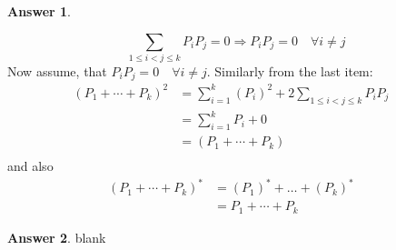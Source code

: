 \documentclass[12pt]{article}
\theoremstyle{plain}
\theoremstyle{definition}
\newtheorem{ans}{Answer}
\begin{document}
\begin{ans}
\begin{enumerate}[(a)]
			\[ \sum_{1 \leq i < j \leq k}P_iP_j = 0 \Rightarrow P_iP_j = 0 \quad \forall i \neq j \]
			Now assume, that $ P_iP_j = 0 \quad \forall i \neq j$. Similarly from the last item:
			\begin{align*}
				(P_1 + \cdots + P_k)^2 &= \sum_{i=1}^{k} (P_i)^2 + 2\sum_{1 \leq i < j \leq k}P_iP_j&\\
				&= \sum_{i=1}^{k} P_i  + 0&\\
				&= (P_1 + \cdots + P_k)&\\
			\end{align*}
			and also
			\begin{align*}
				(P_1 + \cdots + P_k)^{*} &= (P_1)^{*} + \dots + (P_k)^{*}&\\
				&= P_1 + \cdots + P_k
			\end{align*}
	\end{enumerate}
\end{ans}

\noindent \hrulefill

\begin{ans}
	blank
\end{ans}
\end{document}
